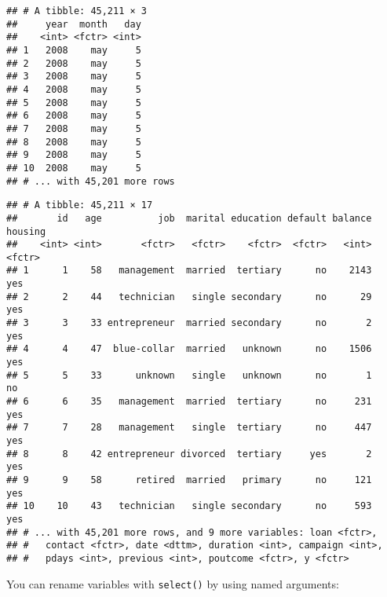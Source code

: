 \documentclass[]{book}
\newenvironment{Shaded}{\begin{snugshade}}{\end{snugshade}}
\newcommand{\KeywordTok}[1]{\textcolor[rgb]{0.13,0.29,0.53}{\textbf{{#1}}}}
\newcommand{\DataTypeTok}[1]{\textcolor[rgb]{0.13,0.29,0.53}{{#1}}}
\newcommand{\StringTok}[1]{\textcolor[rgb]{0.31,0.60,0.02}{{#1}}}
\newcommand{\CommentTok}[1]{\textcolor[rgb]{0.56,0.35,0.01}{\textit{{#1}}}}
\newcommand{\NormalTok}[1]{{#1}}
\begin{document}
\begin{verbatim}
## # A tibble: 45,211 × 3
##     year  month   day
##    <int> <fctr> <int>
## 1   2008    may     5
## 2   2008    may     5
## 3   2008    may     5
## 4   2008    may     5
## 5   2008    may     5
## 6   2008    may     5
## 7   2008    may     5
## 8   2008    may     5
## 9   2008    may     5
## 10  2008    may     5
## # ... with 45,201 more rows
\end{verbatim}

\begin{Shaded}
\end{Shaded}

\begin{verbatim}
## # A tibble: 45,211 × 17
##       id   age          job  marital education default balance housing
##    <int> <int>       <fctr>   <fctr>    <fctr>  <fctr>   <int>  <fctr>
## 1      1    58   management  married  tertiary      no    2143     yes
## 2      2    44   technician   single secondary      no      29     yes
## 3      3    33 entrepreneur  married secondary      no       2     yes
## 4      4    47  blue-collar  married   unknown      no    1506     yes
## 5      5    33      unknown   single   unknown      no       1      no
## 6      6    35   management  married  tertiary      no     231     yes
## 7      7    28   management   single  tertiary      no     447     yes
## 8      8    42 entrepreneur divorced  tertiary     yes       2     yes
## 9      9    58      retired  married   primary      no     121     yes
## 10    10    43   technician   single secondary      no     593     yes
## # ... with 45,201 more rows, and 9 more variables: loan <fctr>,
## #   contact <fctr>, date <dttm>, duration <int>, campaign <int>,
## #   pdays <int>, previous <int>, poutcome <fctr>, y <fctr>
\end{verbatim}

You can rename variables with \texttt{select()} by using named
arguments:

\begin{Shaded}
\end{Shaded}
\end{document}
